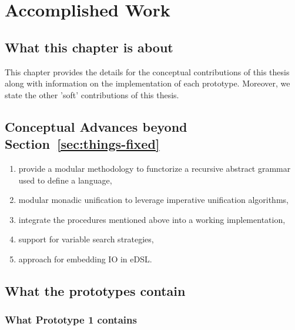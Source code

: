 \documentclass[thesis-solanki.tex]{subfiles}
\begin{document}
\chapter{Accomplished Work}\label{chap:accomplishedWork}

\section{What this chapter is about}\label{sec:what-this-chapter:accomplishedWork}
This chapter provides the details for the conceptual contributions of this thesis along with information on the implementation of each 
prototype. Moreover, we state the other 'soft' contributions of this thesis.



\section{Conceptual Advances beyond Section~\ref{sec:things-fixed}}\label{sec:advances:accomplishedWork}

\begin{enumerate}
\item provide a modular methodology to functorize a recursive abstract grammar used to define a language,

\item modular monadic unification to leverage imperative unification algorithms,

\item integrate the procedures mentioned above into a working  implementation,

\item support for variable search strategies,

\item approach for embedding IO in eDSL.

\end{enumerate}

\section{What the prototypes contain}
\subsection{What Prototype 1 contains}
\end{document}
